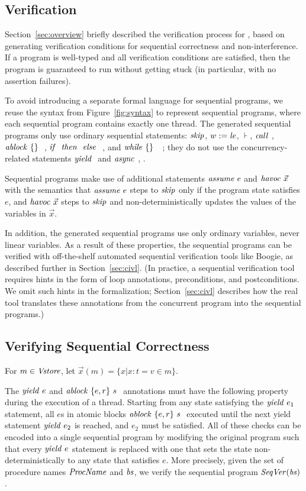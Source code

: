 \subsection{Verification}
\label{sec:verification}

Section~\ref{sec:overview} briefly described the verification process for \civl, based on generating verification conditions for sequential correctness and non-interference.
If a program is well-typed and all verification conditions are satisfied, then the program is guaranteed to run without getting stuck (in particular, with no assertion failures).

To avoid introducing a separate formal language for sequential programs, we reuse the syntax from Figure~\ref{fig:syntax} to represent sequential programs, where each sequential program contains exactly one thread.
The generated sequential programs only use ordinary sequential statements:
$\mathit{skip}$, $w := \mathit{le}$, $\assert{}$, $\mathit{call}\ $, $\mathit{ablock}\ {\{\}}\ {}\ $, ${\mathit{if}\ {}\ }{\mathit{then}\ {}\ }{\mathit{else}\ {}\ }$, and $\mathit{while}\ \{{}\}\ {{}\ } {{}\ }$;
they do not use the concurrency-related statements $\yield$ and $\mathit{async}\ $, .

Sequential programs make use of additional statements  $\mathit{assume}\ e$ and $\mathit{havoc}\ \vec{x}$ with the semantics that $\mathit{assume}\ e$ steps to $\mathit{skip}$ only if the program state satisfies $e$, and $\mathit{havoc}\ \vec{x}$ steps to $\mathit{skip}$ and non-deterministically updates the values of the variables in $\vec{x}$. 

In addition, the generated sequential programs use only ordinary variables, never linear variables.
As a result of these properties, the sequential programs can be verified with off-the-shelf automated sequential verification tools like Boogie, as described further in Section~\ref{sec:civl}.
(In practice, a sequential verification tool requires hints in the form of loop annotations, preconditions, and postconditions.
We omit such hints in the formalization; Section~\ref{sec:civl} describes how the real \civl tool translates these annotations from the concurrent program into the sequential programs.)


\subsection{Verifying Sequential Correctness}
For $m \in \mathit{Vstore}$, let $ \vec{x}(m) = \{ x  |   x : t = v \in m \} $. 


The $\mathit{yield}\ e$ and $\mathit{ablock}\ {\{e,r\}}\ {s}\ $ annotations must have the following property during the execution of a thread. Starting from any state satisfying the $\mathit{yield}\ e_1$ statement, all $e$s in atomic blocks $\mathit{ablock}\ {\{e,r\}}\ {s}\ $ executed until the next yield statement $\mathit{yield}\ e_2$ is reached, and $e_2$ must be satisfied. All of these checks can be encoded into a single sequential program by modifying the original program such that every $\mathit{yield}\ e$ statement is replaced with one that sets the state non-deterministically to any state that satisfies $e$. More precisely, given the set of procedure names $\mathit{ProcName}$ and $\mathit{bs}$, we verify the sequential program ${\mathit{SeqVer}}(\mathit{bs})$.   

